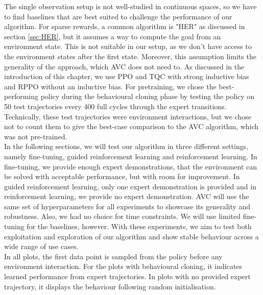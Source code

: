 The single observation setup is not well-studied in continuous spaces, so we have to find baselines that are best suited to challenge the performance of our algorithm. For sparse rewards, a common
algorithm is "HER" as discussed in section \ref{sec:HER}, but it assumes a way to compute the goal from an environment state. This is not suitable in our setup, as we don't have access to the environment
states after the first state. Moreover, this assumption limits the generality of the approach, which AVC does not need to.
As discussed in the introduction of this chapter, we use PPO and TQC with strong inductive bias and RPPO without an inductive bias. 
For pretraining, we chose the best-performing policy during the behavioural cloning phase by testing the policy on 50 test 
trajectories every 400 full cycles through the 
expert transitions. Technically, these test trajectories were environment interactions, but we chose not to count them to give the best-case comparison to the AVC algorithm, which was not pre-trained.\\

In the following sections, we will test our algorithm in three different settings, namely fine-tuning, guided reinforcement learning and reinforcement learning. In fine-tuning, we provide
enough expert demonstrations, that the environment can be solved with acceptable performance, but with room for improvement. In guided reinforcement learning,
only one expert demonstration is provided and in reinforcement learning, we provide no expert demonstration. AVC will use the same set of hyperparameters for all experiments to showcase its generality and robustness. Also, we had no choice for time constraints.
We will use limited fine-tuning for the baselines, however.
With these experiments, we aim to test both exploitation and exploration of our algorithm and show stable
behaviour across a wide range of use cases. \\

In all plots, the first data point is sampled from the policy before any environment interaction. For the plots with behavioural cloning, it indicates learned performance from expert trajectories.
In plots with no provided expert trajectory, it displays the behaviour following random initialisation.

